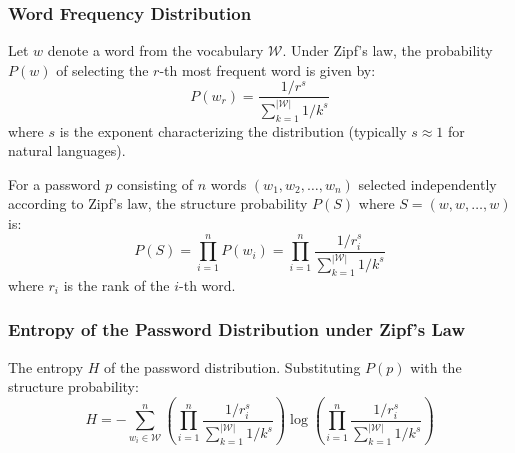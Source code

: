\vspace*{-0.5cm}
\subsubsection{Word Frequency Distribution}
\vspace*{-0.25cm}
   Let \( w \) denote a word from the vocabulary \( \mathcal{W} \). Under Zipf's law, the probability \( P(w) \) of selecting the \( r \)-th most frequent word is given by:
   \begin{equation}
   P(w_r) = \frac{1 / r^s}{\sum_{k=1}^{|\mathcal{W}|} 1 / k^s}
   \end{equation}
   where \( s \) is the exponent characterizing the distribution (typically \( s \approx 1 \) for natural languages).


   For a password \( p \) consisting of \( n \) words \( (w_1, w_2, \dots, w_n) \) selected independently according to Zipf's law, the structure probability \( P(S) \) where \( S = (w, w, \dots, w) \) is:
   \begin{equation}
   P(S) = \prod_{i=1}^{n} P(w_i) = \prod_{i=1}^{n} \frac{1 / r_i^s}{\sum_{k=1}^{|\mathcal{W}|} 1 / k^s}
   \end{equation}
   where \( r_i \) is the rank of the \( i \)-th word.

\subsubsection{Entropy of the Password Distribution under Zipf's Law}

   The entropy \( H \) of the password distribution. Substituting \( P(p) \) with the structure probability:
   \begin{equation}
   H = - \sum_{w_i \in \mathcal{W}}^n \left( \prod_{i=1}^{n} \frac{1 / r_i^s}{\sum_{k=1}^{|\mathcal{W}|} 1 / k^s} \right) \log \left( \prod_{i=1}^{n} \frac{1 / r_i^s}{\sum_{k=1}^{|\mathcal{W}|} 1 / k^s} \right)
   \end{equation}
   
